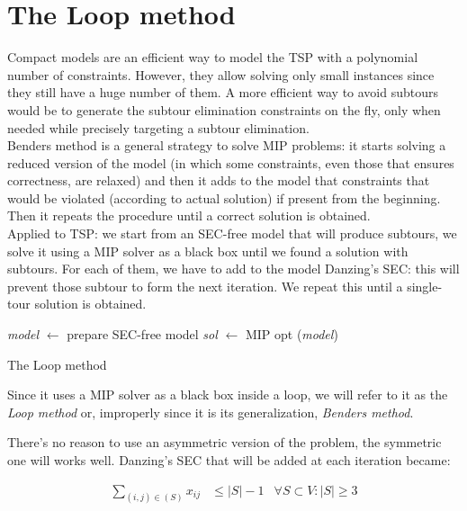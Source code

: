 \section{The Loop method}
Compact models are an efficient way to model the TSP with a polynomial number of
constraints. However, they allow solving only small instances since they still
have a huge number of them. A more efficient way to avoid subtours would be to
generate the subtour elimination constraints on the fly, only when needed while
precisely targeting a subtour elimination.\\
Benders method is a general strategy to solve MIP problems: it starts solving a
reduced version of the model (in which some constraints, even those that ensures
correctness, are relaxed) and then it adds to the model that constraints that
would be violated (according to actual solution) if present from the beginning.
Then it repeats the procedure until a correct solution is obtained.\\
Applied to TSP: we start from an SEC-free model that will produce subtours, we
solve it using a MIP solver as a black box until we found a solution with
subtours. For each of them, we have to add to the model Danzing's SEC: this will
prevent those subtour to form the next iteration. We repeat this until a
single-tour solution is obtained.

\begin{algorithm}[H]
\SetAlgoLined
{}
    \emph{model} $\leftarrow$ prepare SEC-free model\;
    \emph{sol} $\leftarrow$ MIP opt (\emph{model})\;
    \caption{The Loop method}
\end{algorithm}

Since it uses a MIP solver as a black box inside a loop, we will refer to it as
the \emph{Loop method} or, improperly since it is its generalization,
\emph{Benders method}.

There's no reason to use an asymmetric version of the problem, the symmetric one will works well. Danzing's SEC
that will be added at each iteration became:

\begin{equation*} 
    \begin{array}{rrlr} 
        \displaystyle\sum_{(i,j) \in (S)} x_{ij} & \le |S|-1 & \forall S \subset V: |S| \ge 3
    \end{array} 
\end{equation*}

